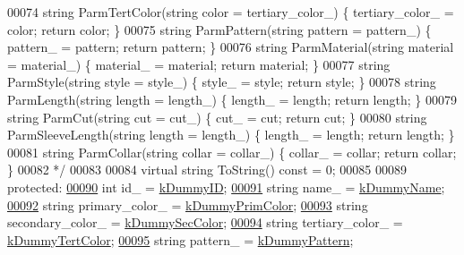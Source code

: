\begin{DoxyCode}
00074 \textcolor{comment}{    string ParmTertColor(string color = tertiary\_color\_) \{ tertiary\_color\_ = color; return color; \}}
00075 \textcolor{comment}{    string ParmPattern(string pattern = pattern\_) \{ pattern\_ = pattern; return pattern; \}}
00076 \textcolor{comment}{    string ParmMaterial(string material = material\_) \{ material\_ = material; return material; \}}
00077 \textcolor{comment}{    string ParmStyle(string style = style\_) \{ style\_ = style; return style; \}}
00078 \textcolor{comment}{    string ParmLength(string length = length\_) \{ length\_ = length; return length; \}}
00079 \textcolor{comment}{    string ParmCut(string cut = cut\_) \{ cut\_ = cut; return cut; \}}
00080 \textcolor{comment}{    string ParmSleeveLength(string length = length\_) \{ length\_ = length; return length; \}}
00081 \textcolor{comment}{    string ParmCollar(string collar = collar\_) \{ collar\_ = collar; return collar; \}}
00082 \textcolor{comment}{    */}
00083  
00084     \textcolor{keyword}{virtual} \textcolor{keywordtype}{string} ToString() \textcolor{keyword}{const} = 0; 
00085 
00089   \textcolor{keyword}{protected}:
\mbox{\hyperlink{classClothes_a8978d931db5ca47c3ccea30def4ae83e}{00090}}     \textcolor{keywordtype}{int}    id\_              = \mbox{\hyperlink{clothes_8h_a77186917343a417a2369cdff0bc86d31}{kDummyID}}; 
\mbox{\hyperlink{classClothes_a7f2275aaae24224d60c48af922c31b65}{00091}}     \textcolor{keywordtype}{string} name\_            = \mbox{\hyperlink{clothes_8h_adba739b5125fd5a4066ec0ef063c0657}{kDummyName}}; 
\mbox{\hyperlink{classClothes_a7cb005bf6cbb7f4eaa40f1b31817559c}{00092}}     \textcolor{keywordtype}{string} primary\_color\_   = \mbox{\hyperlink{clothes_8h_a1b9c685d3bf2811d95b65e0d396c1344}{kDummyPrimColor}}; 
\mbox{\hyperlink{classClothes_ab8f55f67b956b25d71260cffcf273673}{00093}}     \textcolor{keywordtype}{string} secondary\_color\_ = \mbox{\hyperlink{clothes_8h_a71c39811135425d881af7760da63a73a}{kDummySecColor}}; 
\mbox{\hyperlink{classClothes_a3c5f1e7ab531e3ba7a38b930da8078a0}{00094}}     \textcolor{keywordtype}{string} tertiary\_color\_  = \mbox{\hyperlink{clothes_8h_a094dde85547895fd70dafb3ab10c6783}{kDummyTertColor}}; 
\mbox{\hyperlink{classClothes_a1d40145a4eb6d28441f112f030ab5d35}{00095}}     \textcolor{keywordtype}{string} pattern\_         = \mbox{\hyperlink{clothes_8h_a2e72ae4d77adb7bc9cbecf4dea1e9e22}{kDummyPattern}}; 

\end{DoxyCode}
